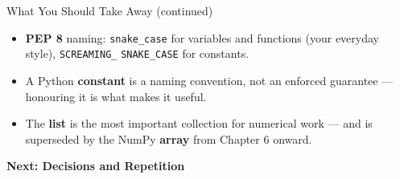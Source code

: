 \documentclass[9pt,aspectratio=169,xcolor=table]{beamer}
\begin{document}
\begin{frame}{What You Should Take Away (continued)}
    \leavevmode
    \small
    \begin{itemize}
        \item \textbf{PEP 8} naming: \texttt{snake\_case} for variables
              and functions (your everyday style), \texttt{SCREAMING\_}
              \texttt{SNAKE\_CASE} for constants.
        \item A Python \textbf{constant} is a naming convention, not an
              enforced guarantee --- honouring it is what makes it
              useful.
        \item The \textbf{list} is the most important collection for
              numerical work --- and is superseded by the NumPy
              \textbf{array} from Chapter 6 onward.
    \end{itemize}

    \vspace{4mm}
    \begin{center}
        \large\color{primary}\textbf{Next: Decisions and Repetition}
    \end{center}
\end{frame}
\end{document}
